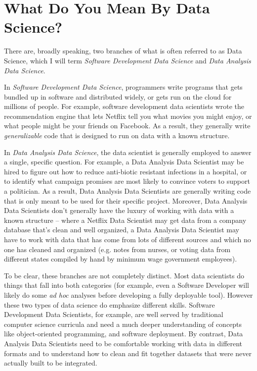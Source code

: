 \documentclass[12pt]{article}
\begin{document}
\section{What Do You Mean By Data Science?}

There are, broadly speaking, two branches of what is often referred to as Data Science, which I will term \emph{Software Development Data Science} and \emph{Data Analysis Data Science}.

In \emph{Software Development Data Science}, programmers write programs that gets bundled up in software and distributed widely, or gets run on the cloud for millions of people. For example, software development data scientists wrote the recommendation engine that lets Netflix tell you what movies you might enjoy, or what people might be your friends on Facebook. As a result, they generally write \emph{generalizable} code that is designed to run on data with a known structure.

In \emph{Data Analysis Data Science}, the data scientist is generally employed to answer a single, specific question. For example, a Data Analysis Data Scientist may be hired to figure out how to reduce anti-biotic resistant infections in a hospital, or to identify what campaign promises are most likely to convince voters to support a politician. As a result, Data Analysis Data Scientists are generally writing code that is only meant to be used for their specific project. Moreover, Data Analysis Data Scientists don't generally have the luxury of working with data with a known structure -- where a Netflix Data Scientist may get data from a company database that's clean and well organized, a Data Analysis Data Scientist may have to work with data that has come from lots of different sources and which no one has cleaned and organized (e.g. notes from nurses, or voting data from different states compiled by hand by minimum wage government employees).

To be clear, these branches are not completely distinct. Most data scientists do things that fall into both categories (for example, even a Software Developer will likely do some \emph{ad hoc} analyses before developing a fully deployable tool). However these two types of data science do emphasize different skills. Software Development Data Scientists, for example, are well served by traditional computer science curricula and need a much deeper understanding of concepts like object-oriented programming, and software deployment. By contrast, Data Analysis Data Scientists need to be comfortable working with data in different formats and to understand how to clean and fit together datasets that were never actually built to be integrated.
\end{document}
